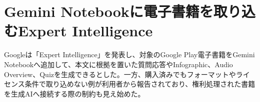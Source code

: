 \section{Gemini Notebookに電子書籍を取り込むExpert Intelligence}
Googleは「Expert Intelligence」を発表し、対象のGoogle Play電子書籍をGemini Notebookへ追加して、本文に根拠を置いた質問応答やInfographic、Audio Overview、Quizを生成できるとした。一方、購入済みでもフォーマットやライセンス条件で取り込めない例が利用者から報告されており、権利処理された書籍を生成AIへ接続する際の制約も見え始めた。
